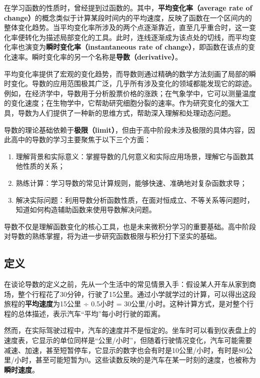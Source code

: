 
\begin{issues}
\issueDraft
\end{issues}

在学习函数的性质时，曾经提到过函数的。其中，\textbf{平均变化率（average rate of change）}的概念类似于计算某段时间内的平均速度，反映了函数在一个区间内的整体变化趋势。当平均变化率所涉及的两个点逐渐靠近，直至几乎重合时，这一变化率便转化为描述局部变化的工具。此时，连线逐渐成为该点处的切线，而平均变化率也演变为\textbf{瞬时变化率（instantaneous rate of change）}，即函数在该点的变化速率。瞬时变化率的另一个名称是\textbf{导数（derivative）}。

平均变化率提供了宏观的变化趋势，而导数则通过精确的数学方法刻画了局部的瞬时变化。导数的应用范围极其广泛，几乎所有涉及变化的领域都能发现它的踪迹。例如，在经济学中，导数用于分析股票价格的涨跌；在气象学中，它可以测量温度的变化速度；在生物学中，它帮助研究细胞分裂的速率。作为研究变化的强大工具，导数为人们提供了一种新的思维方式，帮助深入理解和处理动态问题。

导数的理论基础依赖于\textbf{极限（limit）}，但由于高中阶段未涉及极限的具体内容，因此高中的导数的学习主要聚焦于以下三个方面：
\begin{enumerate}
\item 理解背景和实际意义：掌握导数的几何意义和实际应用场景，理解它与函数其他性质的关系；
\item 熟练计算：学习导数的常见计算规则，能够快速、准确地对复杂函数求导；
\item 解决实际问题：利用导数分析函数性质，在面对恒成立、不等关系等问题时，知道如何构造辅助函数来使用导数解决问题。
\end{enumerate}

导数不仅是理解函数变化的核心工具，也是未来微积分学习的重要基础。高中阶段对导数的熟练掌握，将为进一步研究函数极限与积分打下坚实的基础。

\subsection{定义}

在谈论导数的定义之前，先从一个生活中的常见情景入手：假设某人开车从家到商场，整个行程花了30分钟，行驶了15公里。通过小学就学过的计算，可以得出这段旅程的\textbf{平均速度}为15公里 ÷ 0.5小时 = 30公里/小时。这种计算方式，是对整个行程的总体描述，表示汽车“平均”每小时行驶的距离。

然而，在实际驾驶过程中，汽车的速度并不是恒定的。坐车时可以看到仪表盘上的速度表，它显示的单位同样是“公里/小时”，但随着行驶情况变化，汽车可能需要减速、加速，甚至短暂停车，它显示的数字也会有时是10公里/小时，有时是80公里/小时，甚至可能短暂为0。这些读数反映的是汽车在某一时刻的速度，也被称为\textbf{瞬时速度}。

